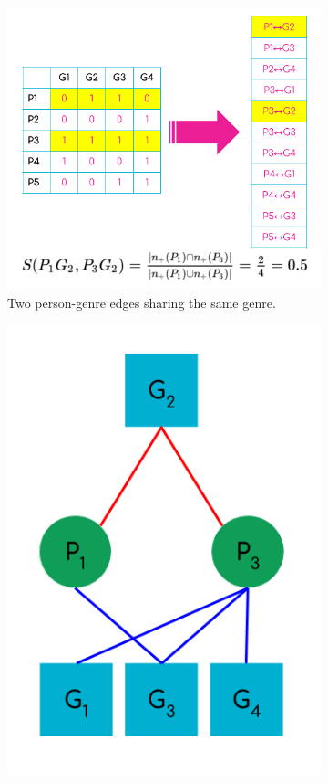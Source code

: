 \documentclass[a4paper,12pt]{extarticle}
\begin{document}
\begin{figure}[t!]
     \centering
     \begin{subfigure}[b]{0.6\textwidth}
        \includegraphics[width=1.0\textwidth]{Toy/link-clust-toy1.png}
        \caption{Two person-genre edges sharing the same genre.}
        \label{fig:link-toy1}
    \end{subfigure} 
     \begin{subfigure}[b]{0.3\textwidth}
        \includegraphics[width=1.0\textwidth]{Toy/link-clust-toy2.png}

\end{subfigure}
\end{figure}
\end{document}
